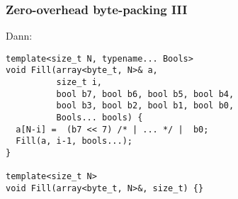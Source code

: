 \documentclass[t,ngerman]{beamer}
\begin{document}
\begin{frame}[fragile]
  \frametitle{Zero-overhead byte-packing III}

Dann:
\begin{lstlisting}
template<size_t N, typename... Bools>
void Fill(array<byte_t, N>& a,
          size_t i,
          bool b7, bool b6, bool b5, bool b4,
          bool b3, bool b2, bool b1, bool b0,
          Bools... bools) {
  a[N-i] =  (b7 << 7) /* | ... */ |  b0;
  Fill(a, i-1, bools...);
}

template<size_t N>
void Fill(array<byte_t, N>&, size_t) {}
\end{lstlisting}


    
\end{frame}
\end{document}
